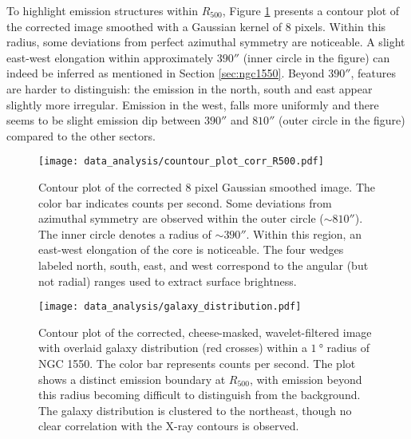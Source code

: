 To highlight emission structures within \(R_{500}\), Figure \ref{fig:contour_fully_corrected} presents a contour plot of the corrected image smoothed with a Gaussian kernel of \(8\) pixels. Within this radius, some deviations from perfect azimuthal symmetry are noticeable. A slight east-west elongation within approximately \(390''\) (inner circle in the figure) can indeed be inferred as mentioned in Section \ref{sec:ngc1550}. Beyond \(390''\), features are harder to distinguish: the emission in the north, south and east appear slightly more irregular. Emission in the west, falls more uniformly and there seems to be slight emission dip between \(390''\) and \(810''\) (outer circle in the figure) compared to the other sectors.
\begin{figure}[htbp]
    \centering
    \texttt{[image: data\_analysis/countour\_plot\_corr\_R500.pdf]}
    \caption{Contour plot of the corrected 8 pixel Gaussian smoothed image. The color bar indicates counts per second. Some deviations from azimuthal symmetry are observed within the outer circle (\(\sim 810''\)). The inner circle denotes a radius of \(\sim 390''\). Within this region, an east-west elongation of the core is noticeable. The four wedges labeled north, south, east, and west correspond to the angular (but not radial) ranges used to extract surface brightness.}
    \label{fig:contour_fully_corrected}
\end{figure}
\begin{figure}[htbp]
    \centering
    \texttt{[image: data\_analysis/galaxy\_distribution.pdf]}
    \caption{Contour plot of the corrected, cheese-masked, wavelet-filtered image with overlaid galaxy distribution (red crosses) within a \(\SI{1}{\degree}\) radius of NGC 1550. The color bar represents counts per second. The plot shows a distinct emission boundary at \(R_{500}\), with emission beyond this radius becoming difficult to distinguish from the background. The galaxy distribution is clustered to the northeast, though no clear correlation with the X-ray contours is observed.}
    \label{fig:contour_wvl_filtered}
\end{figure}
